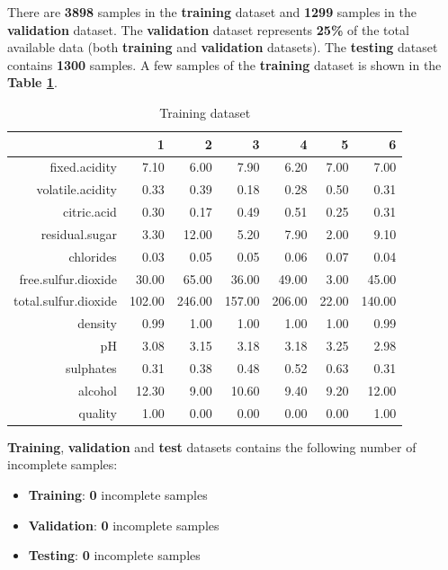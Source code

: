 \documentclass[a4paperpaper,9pt,twocolumn,twoside,printwatermark=false]{pinp}
\providecommand{\tightlist}{%
  \setlength{\itemsep}{0pt}\setlength{\parskip}{0pt}}
\begin{document}
There are \textbf{3898} samples in the \textbf{training} dataset and
\textbf{1299} samples in the \textbf{validation} dataset. The
\textbf{validation} dataset represents \textbf{25\%} of the total
available data (both \textbf{training} and \textbf{validation}
datasets). The \textbf{testing} dataset contains \textbf{1300} samples.
A few samples of the \textbf{training} dataset is shown in the
\textbf{Table \ref{tab:TrainingDataset}}.

\begin{table}[ht]
\begin{center}
\begin{tabular}{r|rrrrrr}
\hline
 & 1 & 2 & 3 & 4 & 5 & 6 \\
\hline
fixed.acidity & 7.10 & 6.00 & 7.90 & 6.20 & 7.00 & 7.00 \\
volatile.acidity & 0.33 & 0.39 & 0.18 & 0.28 & 0.50 & 0.31 \\
citric.acid & 0.30 & 0.17 & 0.49 & 0.51 & 0.25 & 0.31 \\
residual.sugar & 3.30 & 12.00 & 5.20 & 7.90 & 2.00 & 9.10 \\
chlorides & 0.03 & 0.05 & 0.05 & 0.06 & 0.07 & 0.04 \\
free.sulfur.dioxide & 30.00 & 65.00 & 36.00 & 49.00 & 3.00 & 45.00 \\
total.sulfur.dioxide & 102.00 & 246.00 & 157.00 & 206.00 & 22.00 & 140.00 \\
density & 0.99 & 1.00 & 1.00 & 1.00 & 1.00 & 0.99 \\
pH & 3.08 & 3.15 & 3.18 & 3.18 & 3.25 & 2.98 \\
sulphates & 0.31 & 0.38 & 0.48 & 0.52 & 0.63 & 0.31 \\
alcohol & 12.30 & 9.00 & 10.60 & 9.40 & 9.20 & 12.00 \\
quality & 1.00 & 0.00 & 0.00 & 0.00 & 0.00 & 1.00 \\
\hline
\end{tabular}
\caption{\label{tab:TrainingDataset}Training dataset}
\end{center}
\end{table}

\textbf{Training}, \textbf{validation} and \textbf{test} datasets
contains the following number of incomplete samples:

\begin{itemize}
\tightlist
\item
  \textbf{Training}: \textbf{0} incomplete samples
\item
  \textbf{Validation}: \textbf{0} incomplete samples
\item
  \textbf{Testing}: \textbf{0} incomplete samples
\end{itemize}
\end{document}
